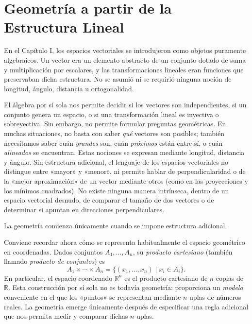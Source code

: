 \chapter{Geometría a partir de la Estructura Lineal}

En el Capítulo I, los espacios vectoriales se introdujeron como objetos puramente algebraicos.
Un vector era un elemento abstracto de un conjunto dotado de suma y multiplicación por escalares,
y las transformaciones lineales eran funciones que preservaban dicha estructura.
No se asumió ni se requirió ninguna noción de longitud, ángulo, distancia u ortogonalidad.

\medskip

El álgebra por sí sola nos permite decidir si los vectores son independientes,
si un conjunto genera un espacio,
o si una transformación lineal es inyectiva o sobreyectiva.
Sin embargo, no permite formular preguntas geométricas.
En muchas situaciones, no basta con saber \emph{qué} vectores son posibles;
también necesitamos saber cuán \emph{grandes} son, cuán \emph{próximos} están entre sí,
o cuán \emph{alineados} se encuentran.
Estas nociones se expresan mediante longitud, distancia y ángulo.
Sin estructura adicional, el lenguaje de los espacios vectoriales no distingue
entre «mayor» y «menor», ni permite hablar de perpendicularidad o de la
«mejor aproximación» de un vector mediante otros
(como en las proyecciones y los mínimos cuadrados).
No existe ninguna manera intrínseca, dentro de un espacio vectorial desnudo,
de comparar el tamaño de dos vectores o de determinar si apuntan en direcciones
perpendiculares.

\medskip

La geometría comienza únicamente cuando se impone estructura adicional.

\medskip

Conviene recordar ahora cómo se representa habitualmente el espacio geométrico
en coordenadas.
Dados conjuntos $A_1,\dots,A_n$, su \emph{producto cartesiano}
(también llamado \emph{producto de conjuntos}) es
\[
A_1\times\cdots\times A_n = \{(x_1,\dots,x_n)\mid x_i\in A_i\}.
\]
En particular, el espacio coordenado $\mathbb{R}^n$ es el producto cartesiano de
$n$ copias de $\mathbb{R}$.
Esta construcción por sí sola no es todavía geometría: proporciona un
\emph{modelo} conveniente en el que los «puntos» se representan mediante
$n$-uplas de números reales.
La geometría emerge únicamente después de especificar una regla adicional que
nos permita medir y comparar dichas $n$-uplas.

